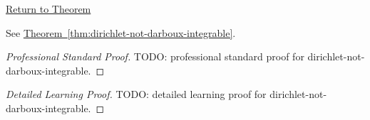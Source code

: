 \newpage
{}
\label{prf:dirichlet-not-darboux-integrable}

\begin{remark*}[Return]
\hyperref[thm:dirichlet-not-darboux-integrable]{Return to Theorem}
\end{remark*}

\begin{theorem*}
See \hyperref[thm:dirichlet-not-darboux-integrable]{Theorem~\ref*{thm:dirichlet-not-darboux-integrable}}.
\end{theorem*}

\begin{proof}[Professional Standard Proof]
\LRAProofBodyStart
TODO: professional standard proof for dirichlet-not-darboux-integrable.
\end{proof}

\begin{proof}[Detailed Learning Proof]
\LRAProofBodyStart
TODO: detailed learning proof for dirichlet-not-darboux-integrable.
\end{proof}

\begin{remark*}
\end{remark*}

\begin{dependencies}
\NoLocalDependencies
\end{dependencies}

\clearpage
